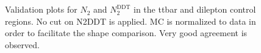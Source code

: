 \begin{figure}
\centering
 \\
 \\
\caption{Validation plots for $N_2$ and $N_2^{\text{DDT}}$  in the ttbar and dilepton control regions. No cut on N2DDT is applied. MC is normalized to data in order to facilitate the shape comparison. Very good agreement is observed. }
\label{fig:n2data_1}
\end{figure}





